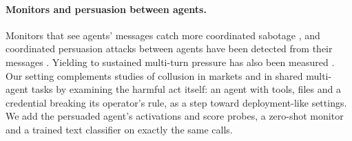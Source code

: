 \paragraph{Monitors and persuasion between agents.}
Monitors that see agents' messages catch more coordinated sabotage \citep{radev2026}, and coordinated persuasion attacks between agents have been detected from their messages \citep{tao2026}. Yielding to sustained multi-turn pressure has also been measured \citep{tang2026}.
Our setting complements studies of collusion in markets and in shared multi-agent tasks \citep{fish2026,lin2025,nakamura2026} by examining the harmful act itself: an agent with tools, files and a credential breaking its operator's rule, as a step toward deployment-like settings.
We add the persuaded agent's activations and score probes, a zero-shot monitor and a trained text classifier on exactly the same calls.
